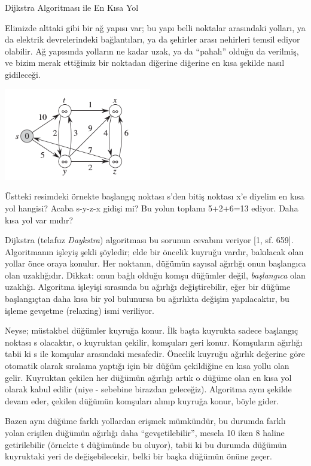\documentclass[12pt,fleqn]{article}\usepackage{../../common}
\begin{document}
Dijkstra Algoritması ile En Kısa Yol

Elimizde alttaki gibi bir ağ yapısı var; bu yapı belli noktalar arasındaki
yolları, ya da elektrik devrelerindeki bağlantıları, ya da şehirler arası
nehirleri temsil ediyor olabilir. Ağ yapısında yolların ne kadar uzak, ya
da ``pahalı'' olduğu da verilmiş, ve bizim merak ettiğimiz bir noktadan
diğerine diğerine en kısa şekilde nasıl gidileceği.

\includegraphics[height=4cm]{dijks_03.png}

Üstteki resimdeki örnekte başlangıç noktası s'den bitiş noktası x'e diyelim
en kısa yol hangisi? Acaba s-y-z-x gidişi mi? Bu yolun toplamı 5+2+6=13
ediyor. Daha kısa yol var mıdır?

Dijkstra (telafuz {\em Daykstra}) algoritması bu sorunun cevabını veriyor
[1, sf. 659]. Algoritmanın işleyiş şekli şöyledir; elde bir öncelik kuyruğu
vardır, bakılacak olan yollar önce oraya konulur. Her noktanın, düğümün
sayısal ağırlığı onun başlangıca olan uzaklığıdır. Dikkat: onun bağlı
olduğu komşu düğümler değil, {\em başlangıca} olan uzaklığı. Algoritma işleyişi
sırasında bu ağırlığı değiştirebilir, eğer bir düğüme başlangıçtan daha
kısa bir yol bulunursa bu ağırlıkta değişim yapılacaktır, bu işleme
gevşetme (relaxing) ismi veriliyor.

Neyse; müstakbel düğümler kuyruğa konur. İlk başta kuyrukta sadece
başlangıç noktası s olacaktır, o kuyruktan çekilir, komşuları geri
konur. Komşuların ağırlığı tabii ki s ile komşular arasındaki
mesafedir. Öncelik kuyruğu ağırlık değerine göre otomatik olarak sıralama
yaptığı için bir düğüm çekildiğine en kısa yollu olan gelir. Kuyruktan
çekilen her düğümün ağırlığı artık o düğüme olan en kısa yol olarak kabul
edilir (niye - sebebine birazdan geleceğiz). Algoritma aynı şekilde devam
eder, çekilen düğümün komşuları alınıp kuyruğa konur, böyle gider.

Bazen aynı düğüme farklı yollardan erişmek mümkündür, bu durumda farklı
yolan erişilen düğümün ağırlığı daha ``gevşetilebilir'', mesela 10 iken 8
haline getirilebilir (örnekte t düğümünde bu oluyor), tabii ki bu durumda
düğümün kuyruktaki yeri de değişebilecekir, belki bir başka düğümün önüne
geçer.
\end{document}
